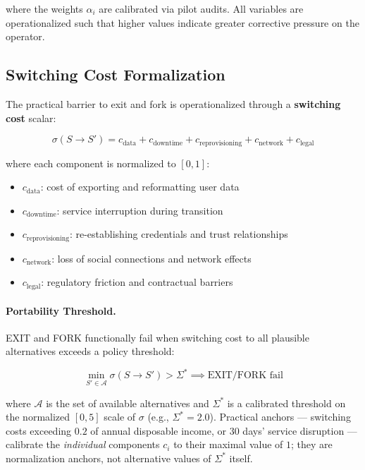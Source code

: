 \documentclass{article}
\begin{document}
where the weights $\alpha_i$ are calibrated via pilot audits. All variables are operationalized such that higher values indicate greater corrective pressure on the operator.

\subsection{Switching Cost Formalization}

The practical barrier to exit and fork is operationalized through a \textbf{switching cost} scalar:

\begin{equation}
\sigma(S \to S') = c_{\text{data}} + c_{\text{downtime}} + c_{\text{reprovisioning}} + c_{\text{network}} + c_{\text{legal}}
\label{eq:switching-cost}
\end{equation}

where each component is normalized to $[0,1]$:
\begin{itemize}[noitemsep]
    \item $c_{\text{data}}$: cost of exporting and reformatting user data
    \item $c_{\text{downtime}}$: service interruption during transition
    \item $c_{\text{reprovisioning}}$: re-establishing credentials and trust relationships
    \item $c_{\text{network}}$: loss of social connections and network effects
    \item $c_{\text{legal}}$: regulatory friction and contractual barriers
\end{itemize}

\paragraph{Portability Threshold.} EXIT and FORK functionally fail when switching cost to all plausible alternatives exceeds a policy threshold:

\begin{equation}
\min_{S' \in \mathcal{A}} \sigma(S \to S') > \Sigma^* \implies \text{EXIT/FORK fail}
\label{eq:portability-threshold}
\end{equation}

where $\mathcal{A}$ is the set of available alternatives and $\Sigma^*$ is a calibrated threshold on the normalized $[0,5]$ scale of $\sigma$ (e.g., $\Sigma^* = 2.0$). Practical anchors --- switching costs exceeding $0.2$ of annual disposable income, or $30$ days' service disruption --- calibrate the \textit{individual} components $c_i$ to their maximal value of $1$; they are normalization anchors, not alternative values of $\Sigma^*$ itself.
\end{document}
